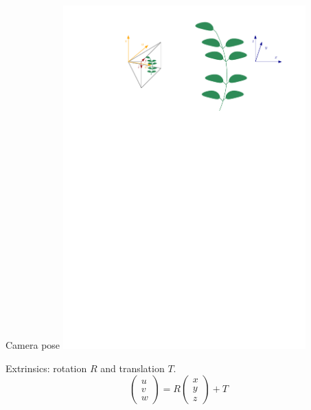 \documentclass{beamer}
\begin{document}
\begin{frame}{Camera pose}
    \centering
    \includegraphics[width=0.7\textwidth]{images/reperes.pdf}

    Extrinsics: rotation $R$ and translation $T$.
    $$\left( \begin{array}{c}
    u \\ v \\ w
    \end{array} \right)= R\left( \begin{array}{c}
    x \\ y \\ z
    \end{array} \right) + T$$
\end{frame}
\end{document}
